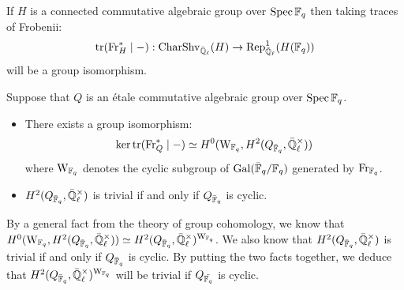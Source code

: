                 \begin{lemma} \label{lemma: sheaf_function_correspondence_for_connected_algebraic_groups}
                    \cite[Proposition 1.14]{cunningham_roe_function_sheaf_dictionary_quasi_characters_p_adic_tori} If $H$ is a connected commutative algebraic group over $\operatorname{Spec} \mathbb{F}_q$ then taking traces of Frobenii:
                        $$\operatorname{tr}(\mathrm{Fr}_H^* \mid -): \mathrm{Char}\mathrm{Shv}_{\bar{\mathbb{Q}}_{\ell}}(H) \to \mathrm{Rep}_{\bar{\mathbb{Q}}_{\ell}}^1(H(\mathbb{F}_q))$$
                    will be a group isomorphism.
                \end{lemma}
                \begin{lemma} \label{lemma: sheaf_function_correspondence_for_etale_commutative_group_schemes}
                    Suppose that $Q$ is an \'etale commutative algebraic group over $\operatorname{Spec} \mathbb{F}_q$.
                    \begin{itemize}
                        \item \cite[Proposition 2.7]{cunningham_roe_function_sheaf_dictionary_quasi_characters_p_adic_tori} There exists a group isomorphism:
                            $$\ker \trace(\Frob_Q^* \mid -) \cong H^0(\rmW_{\F_q}, H^2(Q_{\bar{\F}_q}, \bar{\Q}_{\ell}^{\x}))$$
                        where $\mathrm{W}_{\mathbb{F}_q}$ denotes the cyclic subgroup of $\mathrm{Gal}(\bar{\mathbb{F}}_q/\mathbb{F}_q)$ generated by $\mathrm{Fr}_{\mathbb{F}_q}$. 
                        \item \cite[Remark 2.9]{cunningham_roe_function_sheaf_dictionary_quasi_characters_p_adic_tori} $H^2(Q_{\bar{\F}_q}, \bar{\Q}_{\ell}^{\x})$ is trivial if and only if $Q_{\bar{\mathbb{F}}_q}$ is cyclic.
                    \end{itemize}
                \end{lemma}
                \begin{corollary} \label{coro: kernels_of_traces_of_frobenii_on_etale_group_schemes}
                    By a general fact from the theory of group cohomology, we know that $H^0(\rmW_{\F_q}, H^2(Q_{\bar{\F}_q}, \bar{\Q}_{\ell}^{\x})) \cong H^2(Q_{\bar{\F}_q}, \bar{\Q}_{\ell}^{\x})^{\rmW_{\F_q}}$. We also know that $H^2(Q_{\bar{\F}_q}, \bar{\Q}_{\ell}^{\x})$ is trivial if and only if $Q_{\bar{\mathbb{F}}_q}$ is cyclic. By putting the two facts together, we deduce that $H^2(Q_{\bar{\F}_q}, \bar{\Q}_{\ell}^{\x})^{\rmW_{\F_q}}$ will be trivial if $Q_{\bar{\mathbb{F}_q}}$ is cyclic. 
                \end{corollary}
                
